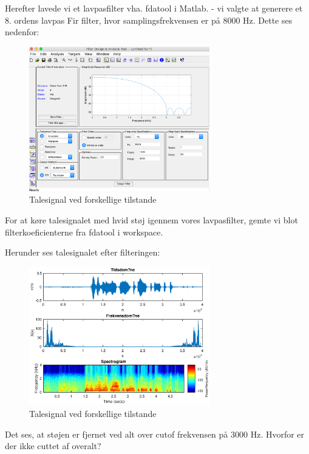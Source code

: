 \documentclass[a4paper]{report}
\begin{document}
Herefter lavede vi et lavpasfilter vha. fdatool i Matlab. - vi valgte at generere et 8. ordens lavpas Fir filter, hvor samplingsfrekvensen er på 8000 Hz. Dette ses nedenfor:  


\begin{figure}[H] 
\centering
\includegraphics[width=0.7\textwidth]{grafer/lavpasfilter}
\caption{Talesignal ved forskellige tilstande} \label{lavpasfilter}
\end{figure}

For at køre talesignalet med hvid støj igennem vores lavpasfilter, gemte vi blot filterkoeficienterne fra fdatool i workspace. 


Herunder ses talesignalet efter filteringen: 

\begin{figure}[H] 
\centering
\includegraphics[width=0.7\textwidth]{grafer/opg1_filter}
\caption{Talesignal ved forskellige tilstande} \label{opg1_filter}
\end{figure}


Det ses, at støjen er fjernet ved alt over cutof frekvensen på 3000 Hz. Hvorfor er der ikke cuttet af overalt? 
\end{document}
